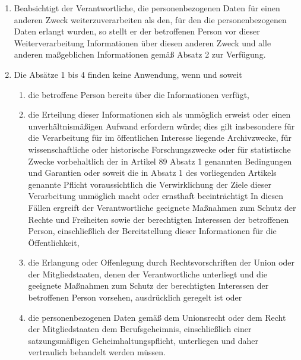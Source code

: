 \begin{enumerate}[label=(\arabic*)]
        \item Beabsichtigt der Verantwortliche, die personenbezogenen Daten für einen anderen Zweck weiterzuverarbeiten als den, für den die personenbezogenen Daten erlangt wurden, so stellt er der betroffenen Person vor dieser Weiterverarbeitung Informationen über diesen anderen Zweck und alle anderen maßgeblichen Informationen gemäß Absatz 2 zur Verfügung.
        \item Die Absätze 1 bis 4 finden keine Anwendung, wenn und soweit
        \begin{enumerate}[label=\alph*)]
            \item die betroffene Person bereits über die Informationen verfügt,
            \item die Erteilung dieser Informationen sich als unmöglich erweist oder einen unverhältnismäßigen Aufwand erfordern würde; dies gilt insbesondere für die Verarbeitung für im öffentlichen Interesse liegende Archivzwecke, für wissenschaftliche oder historische Forschungszwecke oder für statistische Zwecke vorbehaltlich der in Artikel 89 Absatz 1 genannten Bedingungen und Garantien oder soweit die in Absatz 1 des vorliegenden Artikels genannte Pflicht voraussichtlich die Verwirklichung der Ziele dieser Verarbeitung unmöglich macht oder ernsthaft beeinträchtigt In diesen Fällen ergreift der Verantwortliche geeignete Maßnahmen zum Schutz der Rechte und Freiheiten sowie der berechtigten Interessen der betroffenen Person, einschließlich der Bereitstellung dieser Informationen für die Öffentlichkeit,
            \item die Erlangung oder Offenlegung durch Rechtsvorschriften der Union oder der Mitgliedstaaten, denen der Verantwortliche unterliegt und die geeignete Maßnahmen zum Schutz der berechtigten Interessen der betroffenen Person vorsehen, ausdrücklich geregelt ist oder
            \item die personenbezogenen Daten gemäß dem Unionsrecht oder dem Recht der Mitgliedstaaten dem Berufsgeheimnis, einschließlich einer satzungsmäßigen Geheimhaltungspflicht, unterliegen und daher vertraulich behandelt werden müssen. 
        \end{enumerate}
    \end{enumerate}

